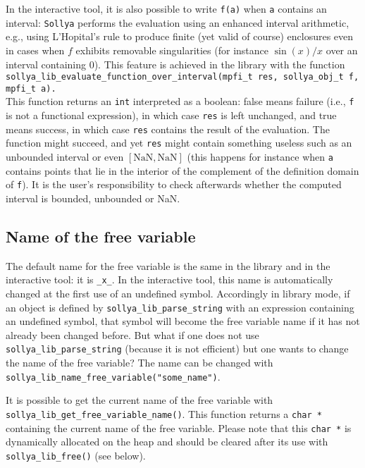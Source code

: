 \documentclass[a4paper]{article}
\newcommand{\sollya}{\texttt{Sollya}\xspace}
\begin{document}
In the interactive tool, it is also possible to write \verb|f(a)| when \verb|a| contains an interval: \sollya performs the evaluation using an enhanced interval arithmetic, e.g., using L'Hopital's rule to produce finite (yet valid of course) enclosures even in cases when $f$ exhibits removable singularities (for instance $\sin(x)/x$ over an interval containing $0$). This feature is achieved in the library with the function\\
\verb|sollya_lib_evaluate_function_over_interval(mpfi_t res, sollya_obj_t f, mpfi_t a).|\\
This function returns an \verb|int| interpreted as a boolean: false means failure (i.e., \verb|f| is not a functional expression), in which case \verb|res| is left unchanged, and true means success, in which case \verb|res| contains the result of the evaluation. The function might succeed, and yet \verb|res| might contain something useless such as an unbounded interval or even $[\textrm{NaN},\textrm{NaN}]$ (this happens for instance when \verb|a| contains points that lie in the interior of the complement of the definition domain of \verb|f|). It is the user's responsibility to check afterwards whether the computed interval is bounded, unbounded or NaN.

\subsection{Name of the free variable}
The default name for the free variable is the same in the library and in the interactive tool: it is \texttt{\_x\_}. In the interactive tool, this name is automatically changed at the first use of an undefined symbol. Accordingly in library mode, if an object is defined by \texttt{sollya\_lib\_parse\_string} with an expression containing an undefined symbol, that symbol will become the free variable name if it has not already been changed before. But what if one does not use \texttt{sollya\_lib\_parse\_string} (because it is not efficient) but one wants to change the name of the free variable? The name can be changed with \texttt{sollya\_lib\_name\_free\_variable("some\_name")}.

It is possible to get the current name of the free variable with \texttt{sollya\_lib\_get\_free\_variable\_name()}. This function returns a \texttt{char *} containing the current name of the free variable. Please note that this \texttt{char *} is dynamically allocated on the heap and should be cleared after its use with \texttt{sollya\_lib\_free()} (see below).
\end{document}
